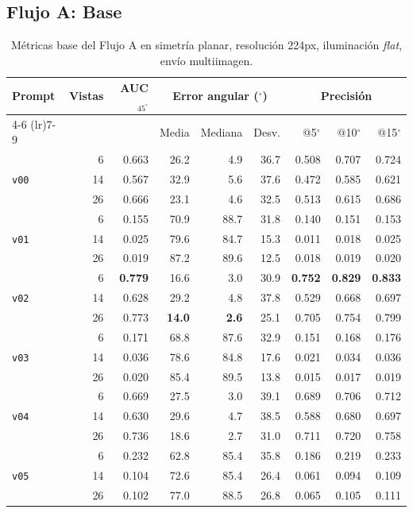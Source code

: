 \newpage
\clearpage
\subsection{Flujo A: Base}

\begin{table}[H]
\centering
\caption{Métricas base del Flujo A en simetría planar, resolución 224px, iluminación \textit{flat}, envío multiimagen.}
\label{tab:nov_plane_base}
\footnotesize
\setlength{\tabcolsep}{3pt}
\renewcommand{\arraystretch}{0.95}

\begin{tabular*}{\textwidth}{@{\extracolsep{\fill}}lrrrrrrrr@{}}
\toprule
\multirow{2}{*}{Prompt} & \multirow{2}{*}{Vistas} & \multirow{2}{*}{AUC$_{45^\circ}$} & \multicolumn{3}{c}{Error angular ($^\circ$)} & \multicolumn{3}{c}{Precisión} \\
\cmidrule(lr){4-6} \cmidrule(lr){7-9}
 &  &  & Media & Mediana & Desv. & @5$^\circ$ & @10$^\circ$ & @15$^\circ$ \\
\midrule
\multirow{3}{*}{\texttt{v00}} & 6 & 0.663 & 26.2 & 4.9 & 36.7 & 0.508 & 0.707 & 0.724 \\
 & 14 & 0.567 & 32.9 & 5.6 & 37.6 & 0.472 & 0.585 & 0.621 \\
 & 26 & 0.666 & 23.1 & 4.6 & 32.5 & 0.513 & 0.615 & 0.686 \\
\midrule
\multirow{3}{*}{\texttt{v01}} & 6 & 0.155 & 70.9 & 88.7 & 31.8 & 0.140 & 0.151 & 0.153 \\
 & 14 & 0.025 & 79.6 & 84.7 & 15.3 & 0.011 & 0.018 & 0.025 \\
 & 26 & 0.019 & 87.2 & 89.6 & 12.5 & 0.018 & 0.019 & 0.020 \\
\midrule
\multirow{3}{*}{\texttt{v02}} & 6 & \textbf{0.779} & 16.6 & 3.0 & 30.9 & \textbf{0.752} & \textbf{0.829} & \textbf{0.833} \\
 & 14 & 0.628 & 29.2 & 4.8 & 37.8 & 0.529 & 0.668 & 0.697 \\
 & 26 & 0.773 & \textbf{14.0} & \textbf{2.6} & 25.1 & 0.705 & 0.754 & 0.799 \\
\midrule
\multirow{3}{*}{\texttt{v03}} & 6 & 0.171 & 68.8 & 87.6 & 32.9 & 0.151 & 0.168 & 0.176 \\
 & 14 & 0.036 & 78.6 & 84.8 & 17.6 & 0.021 & 0.034 & 0.036 \\
 & 26 & 0.020 & 85.4 & 89.5 & 13.8 & 0.015 & 0.017 & 0.019 \\
\midrule
\multirow{3}{*}{\texttt{v04}} & 6 & 0.669 & 27.5 & 3.0 & 39.1 & 0.689 & 0.706 & 0.712 \\
 & 14 & 0.630 & 29.6 & 4.7 & 38.5 & 0.588 & 0.680 & 0.697 \\
 & 26 & 0.736 & 18.6 & 2.7 & 31.0 & 0.711 & 0.720 & 0.758 \\
\midrule
\multirow{3}{*}{\texttt{v05}} & 6 & 0.232 & 62.8 & 85.4 & 35.8 & 0.186 & 0.219 & 0.233 \\
 & 14 & 0.104 & 72.6 & 85.4 & 26.4 & 0.061 & 0.094 & 0.109 \\
 & 26 & 0.102 & 77.0 & 88.5 & 26.8 & 0.065 & 0.105 & 0.111 \\
\bottomrule
\end{tabular*}


\end{table}
